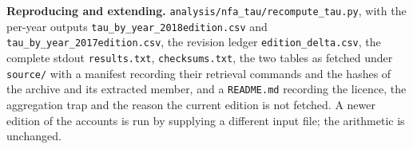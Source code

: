 \documentclass[11pt]{article}
\begin{document}
\textbf{Reproducing and extending.} \texttt{analysis/nfa\_tau/recompute\_tau.py}, with the per-year outputs \texttt{tau\_by\_year\_2018edition.csv} and \texttt{tau\_by\_year\_2017edition.csv}, the revision ledger \texttt{edition\_delta.csv}, the complete stdout \texttt{results.txt}, \texttt{checksums.txt}, the two tables as fetched under \texttt{source/} with a manifest recording their retrieval commands and the hashes of the archive and its extracted member, and a \texttt{README.md} recording the licence, the aggregation trap and the reason the current edition is not fetched. A newer edition of the accounts is run by supplying a different input file; the arithmetic is unchanged.
\end{document}
